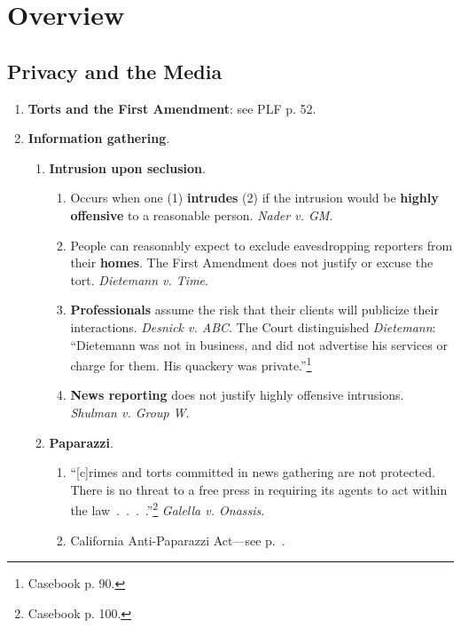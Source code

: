 \section{Overview}

\subsection{Privacy and the Media}

\begin{enumerate}
    \item \textbf{Torts and the First Amendment}: see PLF p. 52.
    \item \textbf{Information gathering}.
    \begin{enumerate}
        \item \textbf{Intrusion upon seclusion}.
        \begin{enumerate}
            \item Occurs when one (1) \textbf{intrudes} (2) if the intrusion 
            would be \textbf{highly offensive} to a reasonable person. 
            \emph{Nader v. GM}.
            \item People can reasonably expect to exclude eavesdropping 
            reporters from their \textbf{homes}. The First Amendment does not 
            justify or excuse the tort. \emph{Dietemann v. Time}.
            \item \textbf{Professionals} assume the risk that their clients 
            will publicize their interactions. \emph{Desnick v. ABC}. The 
            Court distinguished \emph{Dietemann}: ``Dietemann was not in 
            business, and did not advertise his services or charge for them. 
            His quackery was private.''\footnote{Casebook p. 90.}
            \item \textbf{News reporting} does not justify highly offensive 
            intrusions.  \emph{Shulman v. Group W}.
        \end{enumerate}
        \item \textbf{Paparazzi}.
        \begin{enumerate}
            \item ``[c]rimes and torts committed in news gathering are not 
            protected. There is no threat to a free press in requiring its 
            agents to act within the law~.~.~.~.''\footnote{Casebook p. 100.} 
            \emph{Galella v. Onassis}.
            \item California Anti-Paparazzi Act---see 
            p.~\pageref{par:cal-paparazzi}.

\end{enumerate}
\end{enumerate}
\end{enumerate}
